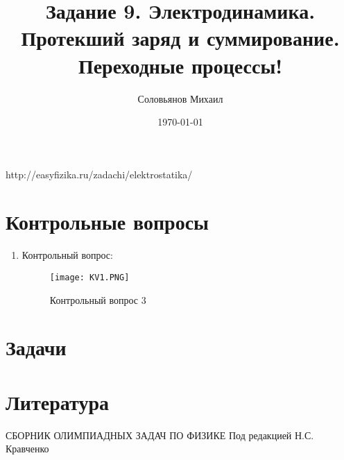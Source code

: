 \documentclass[a4paper,12pt]{article} %
\author{Соловьянов Михаил }
\title{Задание 9. Электродинамика.  Протекший заряд и суммирование. Переходные процессы!}
\date{\today}
\begin{document}
\maketitle
http://easyfizika.ru/zadachi/elektrostatika/






\section{Контрольные вопросы}
\begin{enumerate}






\item Контрольный вопрос:
\begin{figure}[H]
\centering
  \texttt{[image: KV1.PNG]}
  \caption{Контрольный вопрос 3}
  \label{task0}
\end{figure}

\end{enumerate}


\section{Задачи}
\begin{enumerate}









\end{enumerate}

\section{Литература}
\begin{thebibliography}{}
     СБОРНИК ОЛИМПИАДНЫХ ЗАДАЧ ПО ФИЗИКЕ Под редакцией Н.С. Кравченко
	
\end{thebibliography}
\end{document}
